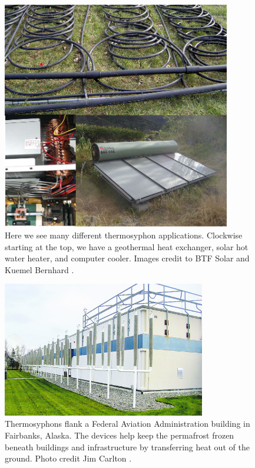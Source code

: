 \documentclass[12pt]{report}
\begin{document}
\begin{figure}[t!]
  \centering
  \includegraphics[width=0.89\textwidth]{figures/many-thermosyphons.jpg}
  \caption[Here we see many different thermosyphon applications]{
    Here we see many different thermosyphon applications.
    Clockwise starting at the top, we have a geothermal heat exchanger, solar hot water heater, and computer cooler. 
    Images credit to BTF Solar and Kuemel Bernhard {\protect{}}.
  }
  \label{fig:thermosyphons}
\end{figure}

\begin{figure}[t!]
  \centering
  \includegraphics[width=0.79\textwidth]{figures/fairbanks-thermosyphon.jpg}
  \caption[Thermosyphons flank a Federal Aviation Administration building in Fairbanks, Alaska]{
  Thermosyphons flank a Federal Aviation Administration building in Fairbanks, Alaska. 
  The devices help keep the permafrost frozen beneath buildings and infrastructure by transferring heat out of the ground.
  Photo credit Jim Carlton {\protect{}}.    
  }
  \label{fig:fairbanks}
\end{figure}
\end{document}
